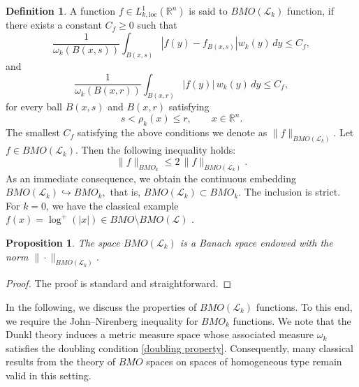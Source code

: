 \documentclass[11pt, reqno]{amsproc}
\newtheorem{proposition}[theorem]{Proposition}
\theoremstyle{definition}
\newtheorem{definition}[theorem]{Definition}
\theoremstyle{remark}
\numberwithin{equation}{section}
\begin{document}
\begin{definition}
    A function $f \in L_{k,\mathrm{loc}}^{1}(\mathbb{R}^n)$ is said to  $BMO(\mathcal{L}_k)$ function, if there exists a constant $C_f \geq 0$ such that
\[
\frac{1}{\omega_k(B(x,s))} \int_{B(x,s)} \left|f(y)-f_{B(x,s)}\right| w_k(y)\,dy \leq C_f,
\]
and
\[
\frac{1}{\omega_k(B(x,r))} \int_{B(x,r)} |f(y)|\, w_k(y)\,dy \leq C_f,
\]
for every ball $B(x,s)$ and $B(x,r)$ satisfying
\[
s<\rho_k(x)\le r,
\qquad x\in \mathbb{R}^n .
\] The smallest $C_f$ satisfying the above conditions we denote as $\|f\|_{BMO(\mathcal{L}_k)}$. Let $f \in BMO(\mathcal{L}_k)$. Then the following inequality holds:
\begin{equation}\label{bmo-BMO}
    \|f\|_{BMO_k} \leq 2\,\|f\|_{BMO(\mathcal{L}_k)}.
\end{equation}
As an immediate consequence, we obtain the continuous embedding $BMO(\mathcal{L}_k) \hookrightarrow BMO_k,$
that is, $BMO(\mathcal{L}_k) \subset BMO_k$. The inclusion is strict. For $k=0$, we have the classical example $f(x)=\log^+(|x|) \in BMO\setminus BMO(\mathcal{L})$ \cite{Bennett}. 
\end{definition}
\begin{proposition}
    The space $BMO(\mathcal{L}_k)$ is a Banach space endowed with the norm
    $\|\cdot\|_{BMO(\mathcal{L}_k)}$.
\end{proposition}
\begin{proof}
    The proof is standard and straightforward. 
\end{proof}
In the following, we discuss the properties of $BMO(\mathcal{L}_k)$ functions. To this end, we require the John–Nirenberg inequality for $BMO_k$ functions. We note that the Dunkl theory induces a metric measure space whose associated measure $\omega_k$ satisfies the doubling condition \eqref{doubling property}. Consequently, many classical results from the theory of  $BMO$ spaces on spaces of homogeneous type remain valid in this setting.
\end{document}
